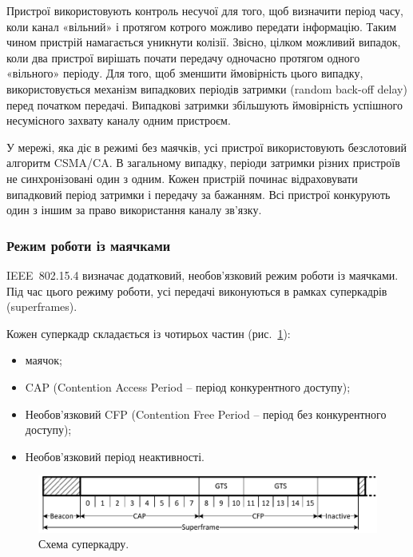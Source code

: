 \documentclass[a4paper,ukrainian,utf8,nocolumnsxix,floatsection]{eskdtext}
\renewcommand\paragraph{\subsubsection}
\newcommand{\figref}[1]{рис.~\ref{#1}}
\newcommand{\iee}[0]{IEEE~802.15.4\xspace}
\newcommand{\csma}[0]{CSMA/CA\xspace}
\begin{document}
Пристрої використовують контроль несучої для того, щоб визначити період часу, коли канал «вільний» і протягом котрого можливо передати інформацію. Таким чином пристрій намагається уникнути колізії. Звісно, цілком можливий випадок, коли два пристрої вирішать почати передачу  одночасно протягом одного  «вільного» періоду. Для того, щоб зменшити ймовірність цього випадку, використовується механізм випадкових періодів затримки (random back-off delay) перед початком передачі. Випадкові затримки збільшують ймовірність успішного несумісного захвату каналу одним пристроєм.

У мережі, яка діє в режимі без маячків, усі пристрої використовують безслотовий алгоритм \csma. В загальному випадку, періоди затримки різних пристроїв не синхронізовані один з одним.  Кожен пристрій починає відраховувати випадковий період затримки і передачу за бажанням. Всі пристрої конкурують один з іншим за право використання каналу зв’язку. 

\clearpage

\paragraph{Режим роботи із маячками}
\label{par:beacon:enabled:mode}

\iee визначає додатковий, необов’язковий режим роботи із маячками. Під час цього режиму роботи, усі передачі виконуються в рамках суперкадрів (superframes). 

Кожен суперкадр складається із чотирьох частин (\figref{fig:superframe}):

\begin{itemize}
	\item маячок;
	\item CAP (Contention Access Period – період конкурентного доступу);
	\item Необов’язковий CFP (Contention Free Period – період без конкурентного доступу);
	\item Необов’язковий період неактивності.
\end{itemize}

\begin{figure}[bth]
	\centering
	\includegraphics[width=\textwidth]{img/superframe.pdf}
	\caption{\label{fig:superframe}Схема суперкадру.}
\end{figure}
\end{document}
